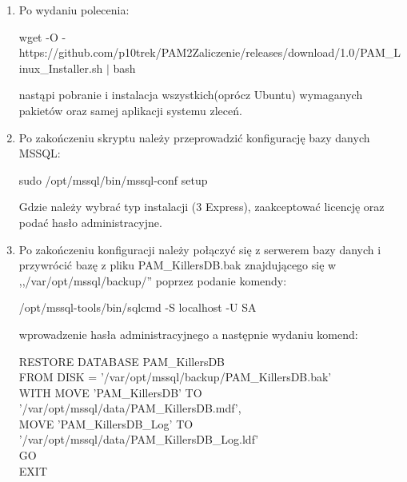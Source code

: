 \documentclass[12pt,a4paper]{article}
\begin{document}
			\begin{enumerate}
				\item Po wydaniu polecenia:
					\begin{tcolorbox}[minipage,colback=white,arc=0pt,outer arc=0pt, fontupper=\scriptsize]
						wget -O - https://github.com/p10trek/PAM2Zaliczenie/releases/download/1.0/PAM\_Linux\_Installer.sh $|$ bash
					\end{tcolorbox}			
					nastąpi pobranie i instalacja wszystkich(oprócz Ubuntu) wymaganych pakietów oraz samej aplikacji systemu zleceń.
			
				\item Po zakończeniu skryptu należy przeprowadzić konfigurację bazy danych MSSQL:
					\begin{tcolorbox}[minipage,colback=white,arc=0pt,outer arc=0pt, fontupper=\footnotesize]			
						sudo /opt/mssql/bin/mssql-conf setup
					\end{tcolorbox}
					Gdzie należy wybrać typ instalacji (3 Express), zaakceptować licencję oraz podać hasło administracyjne.
					
				\item Po zakończeniu konfiguracji należy połączyć się z serwerem bazy danych i przywrócić bazę z pliku
					PAM\_KillersDB.bak znajdującego się w ,,/var/opt/mssql/backup/'' poprzez podanie komendy:
					\begin{tcolorbox}[minipage,colback=white,arc=0pt,outer arc=0pt, fontupper=\footnotesize]			
						/opt/mssql-tools/bin/sqlcmd -S localhost -U SA
					\end{tcolorbox}
					wprowadzenie hasła administracyjnego a następnie wydaniu komend:
					\begin{tcolorbox}[minipage,colback=white,arc=0pt,outer arc=0pt, fontupper=\footnotesize]			
						RESTORE DATABASE PAM\_KillersDB	\\
						FROM DISK = '/var/opt/mssql/backup/PAM\_KillersDB.bak'	\\
						WITH MOVE 'PAM\_KillersDB' TO '/var/opt/mssql/data/PAM\_KillersDB.mdf',	\\
						MOVE 'PAM\_KillersDB\_Log' TO '/var/opt/mssql/data/PAM\_KillersDB\_Log.ldf'	\\
						GO \\
						EXIT
					\end{tcolorbox}				
			

\end{enumerate}
\end{document}
